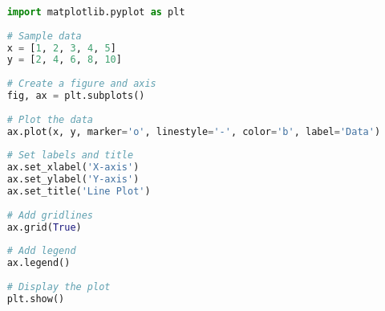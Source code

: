 \begin{lstlisting}[language=Python]
	
	import matplotlib.pyplot as plt
	
	# Sample data
	x = [1, 2, 3, 4, 5]
	y = [2, 4, 6, 8, 10]
	
	# Create a figure and axis
	fig, ax = plt.subplots()
	
	# Plot the data
	ax.plot(x, y, marker='o', linestyle='-', color='b', label='Data')
	
	# Set labels and title
	ax.set_xlabel('X-axis')
	ax.set_ylabel('Y-axis')
	ax.set_title('Line Plot')
	
	# Add gridlines
	ax.grid(True)
	
	# Add legend
	ax.legend()
	
	# Display the plot
	plt.show()
	
\end{lstlisting}

